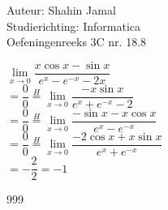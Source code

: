 \documentclass[a4paper]{article}
\begin{document}
  
\noindent \large Auteur: Shahin Jamal \\
\noindent \large Studierichting: Informatica\\
\noindent \large Oefeningenreeks 3C nr. 18.8\\

\medskip

\normalsize

$\lim\limits_{x \rightarrow 0}\dfrac{x\cos x - \sin x}{e^x - e^{-x} - 2x}$\\

$= \dfrac{0}{0} \overset{H}{=} \lim\limits_{x \rightarrow 0}\dfrac{-x\sin x}{e^x + e^{-x} - 2}$\\

$= \dfrac{0}{0} \overset{H}{=} \lim\limits_{x \rightarrow 0}\dfrac{-\sin x - x \cos x}{e^x - e^{-x}}$\\

$= \dfrac{0}{0} \overset{H}{=} \lim\limits_{x \rightarrow 0} \dfrac{-2\cos x + x \sin x}{e^x + e^{-x}}$\\

$= -\dfrac{2}{2} = -1$\\

\begin{thebibliography}{999}
\end{thebibliography}
\end{document}

